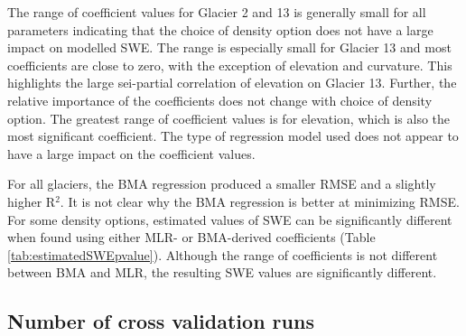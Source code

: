\documentclass{sfuthesis}
\begin{document}
The range of coefficient values for Glacier 2 and 13 is generally small for all parameters indicating that the choice of density option does not have a large impact on modelled SWE. The range is especially small for Glacier 13 and most coefficients are close to zero, with the exception of elevation and curvature. This highlights the large sei-partial correlation of elevation on Glacier 13. Further, the relative importance of the coefficients does not change with choice of density option. The greatest range of coefficient values is for elevation, which is also the most significant coefficient. The type of regression model used does not appear to have a large impact on the coefficient values.

For all glaciers, the BMA regression produced a smaller RMSE and a slightly higher R$^2$. It is not clear why the BMA regression is better at minimizing RMSE. For some density options, estimated values of SWE can be significantly different when found using either MLR- or BMA-derived coefficients (Table \ref{tab:estimatedSWEpvalue}). Although the range of coefficients is not different between BMA and MLR, the resulting SWE values are significantly different. 

\subsection{Number of cross validation runs}
\end{document}
